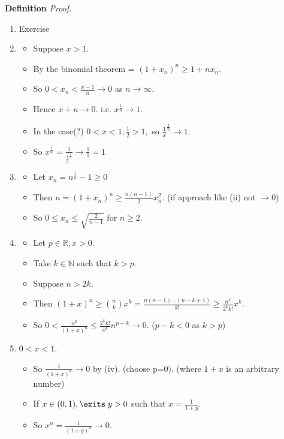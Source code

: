 \documentclass[12pt]{article}
\begin{document}
\begin{block}{\bf Definition}
{\sl Proof.}
\begin{enumerate}[label=(\roman*)]
    \item Exercise
    \item 
    \begin{itemize}
        \item Suppose $x>1$.
        \item By the binomial theorem = $(1+x_n)^n \ge 1+nx_n$.
        \item So $0 < x_n < \frac{x-1}{n} \rightarrow 0$ as $n\rightarrow \infty$.
        \item Hence $x+n \rightarrow 0$. i.e. $x^{\frac{1}{n}} \rightarrow 1$.
        \item In the case(?) $0<x<1, \frac{1}{2} > 1,$ so $\frac{1}{x}^{\frac{1}{n}} \rightarrow 1$.
        \item So $x^{\frac{1}{n}} = \frac{1}{\frac{1}{2}^{\frac{1}{n}}} \rightarrow \frac{1}{1} = 1$
    \end{itemize}

    \item 
    \begin{itemize}
        \item Let $x_n = n^{\frac{1}{n}} -1 \ge 0$
        \item Then $n = (1+x_n)^n \ge \frac{n(n-1)}{2}x_n^2$.
        \hfill (if approach like (ii) not $\to 0$)
        \item So $0 \le x_n \le \sqrt{\frac{2}{n-1}}$ for $n\ge 2$.
    \end{itemize}
    
    
    \item 
    \begin{itemize}
        \item Let $p \in \mathbb{R}, x>0$.
        \item Take $k \in \mathbb{N}$ such that $k > p$.
        \item Suppose $n > 2k$.
        \item Then $(1+x)^n \ge \binom{n}k x^k = \frac{n(n-1)\ldots(n-k+1)}{k!} \ge \frac{n^k}{2^k k!} x^k.$
        \item So $0< \frac{n^p}{(1+x)^n} \le \frac{2^k k!}{x^k} n^{p-k} \rightarrow 0$. 
        \hfill ($p-k<0$ as $k>p$)
    \end{itemize}
    
    
    \item $0<x<1$.
    \begin{itemize}
        \item So $\frac{1}{(1+x)^n} \rightarrow 0$ by (iv). (choose p=0).
        \hfill (where $1+x$ is an arbitrary number)
        \item If $x \in (0,1), \exits\; y>0$ such that $x = \frac{1}{1+y}$.
        \item So $x^n = \frac{1}{(1+y)^n} \rightarrow 0$.
    \end{itemize}
\end{enumerate}


\end{block}
\end{document}
